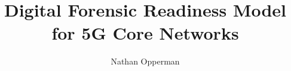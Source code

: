 \documentclass[final,1p,times,authoryear]{elsarticle}
\begin{document}
\begin{frontmatter}



\title{Digital Forensic Readiness Model for 5G Core Networks} %


\author{Nathan Opperman}



\end{frontmatter}
\end{document}
